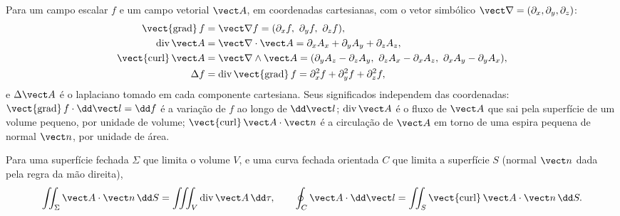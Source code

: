 \begin{definition}\label{def:b2:maxwell-equations:operators}
Para um campo escalar $f$ e um campo vetorial $\vect A$, em coordenadas
cartesianas, com o vetor simbólico $\vect\nabla = (\partial_x, \partial_y,
\partial_z)$:
\begin{align*}
\operatorname{\vect{grad}}f &= \vect\nabla f = (\partial_xf,\ \partial_yf,\ \partial_zf) ,\\
\operatorname{div}\vect A &= \vect\nabla\cdot\vect A = \partial_xA_x + \partial_yA_y + \partial_zA_z ,\\
\operatorname{\vect{curl}}\vect A &= \vect\nabla\wedge\vect A = (\partial_yA_z - \partial_zA_y,\ \partial_zA_x - \partial_xA_z,\ \partial_xA_y - \partial_yA_x) ,\\
\Delta f &= \operatorname{div}\operatorname{\vect{grad}}f = \partial_x^2f + \partial_y^2f + \partial_z^2f ,
\end{align*}
e $\Delta\vect A$ é o laplaciano tomado em cada componente cartesiana.
Seus significados independem das coordenadas: $\operatorname{\vect{grad}}f
\cdot\dd\vect l = \dd f$ é a variação de $f$ ao longo de $\dd\vect l$; $\operatorname{div}
\vect A$ é o fluxo de $\vect A$ que sai pela superfície de um volume
pequeno, por unidade de volume; $\operatorname{\vect{curl}}\vect A\cdot\vect n$ é a
circulação de $\vect A$ em torno de uma espira pequena de normal $\vect n$, por unidade de
área.
\end{definition}

\begin{theorem}\label{thm:b2:maxwell-equations:theorems}
Para uma superfície fechada $\Sigma$ que limita o volume $V$, e uma curva
fechada orientada $C$ que limita a superfície $S$ (normal $\vect n$ dada pela
regra da mão direita),
\[
\iint_\Sigma\vect A\cdot\vect n\,\dd S = \iiint_V\operatorname{div}\vect A\,\dd\tau ,
\qquad
\oint_C\vect A\cdot\dd\vect l = \iint_S\operatorname{\vect{curl}}\vect A\cdot\vect n\,\dd S .
\]
\end{theorem}
\admitted

